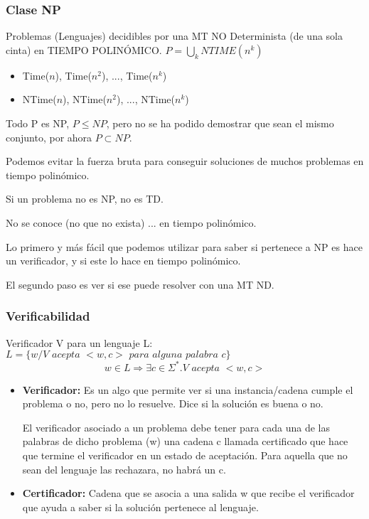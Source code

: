 \subsubsection{Clase NP}
Problemas (Lenguajes) decidibles por una MT NO Determinista (de una sola cinta) en TIEMPO POLINÓMICO. $P= \bigcup_k NTIME(n^k)$
\begin{itemize}
  \item Time($n$), Time($n^2$), ..., Time($n^k$)
  \item NTime($n$), NTime($n^2$), ..., NTime($n^k$)
\end{itemize}

Todo P es NP, $P \leq NP$, pero no se ha podido demostrar que sean el mismo conjunto, por ahora $P \subset NP$.

Podemos evitar la fuerza bruta para conseguir soluciones de muchos problemas en tiempo polinómico.

Si un problema no es NP, no es TD.

No se conoce (no que no exista) ... en tiempo polinómico.

Lo primero y más fácil que podemos utilizar para saber si pertenece a NP es hace un verificador, y si este lo hace en tiempo polinómico.

El segundo paso es ver si ese puede resolver con una MT ND.

\subsubsection{Verificabilidad}
Verificador V para un lenguaje L: $L=\{w / V \textit{ acepta } <w,c> \textit{ para alguna palabra }c\}$
$$w \in L \Rightarrow \exists c \in \Sigma^*. V \textit{ acepta } <w, c>$$
\begin{itemize}
  \item \textbf{Verificador:} Es un algo que permite ver si una instancia/cadena cumple el problema o no, pero no lo resuelve. Dice si la solución es buena o no. 
  
  El verificador asociado a un problema debe tener para cada una de las palabras de dicho problema (w) una cadena c llamada certificado que hace que termine el verificador en un estado de aceptación. Para aquella que no sean del lenguaje las rechazara, no habrá un c.
  \item \textbf{Certificador:} Cadena que se asocia a una salida w que recibe el verificador que ayuda a saber si la solución pertenece al lenguaje.
\end{itemize}

